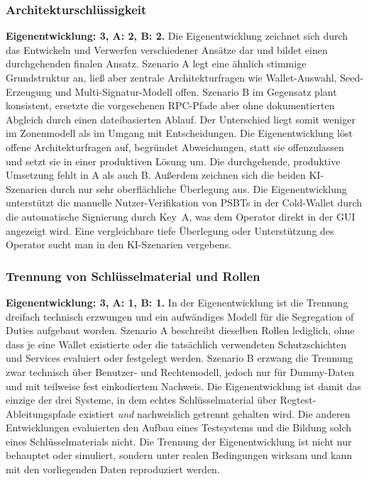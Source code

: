 {\subsubsection{Architekturschlüssigkeit}
\textbf{Eigenentwicklung: 3, A: 2, B: 2.} Die Eigenentwicklung zeichnet sich durch das Entwickeln und Verwerfen verschiedener Ansätze dar und bildet einen durchgehenden finalen Ansatz.
Szenario A legt eine ähnlich stimmige Grundstruktur an, ließ aber zentrale Architekturfragen wie Wallet-Auswahl, Seed-Erzeugung und Multi-Signatur-Modell offen.
Szenario B im Gegensatz plant konsistent, ersetzte die vorgesehenen \ac{RPC}-Pfade aber ohne dokumentierten Abgleich durch einen dateibasierten Ablauf. Der Unterschied liegt somit weniger im Zonenmodell als im Umgang mit Entscheidungen.
Die Eigenentwicklung löst offene Architekturfragen auf, begründet Abweichungen, statt sie offenzulassen und setzt sie in einer produktiven Lösung um. Die durchgehende, produktive Umsetzung fehlt in A als auch B.
Außerdem zeichnen sich die beiden \ac{KI}-Szenarien durch nur sehr oberflächliche Überlegung aus. Die Eigenentwicklung unterstützt die manuelle Nutzer-Verifikation von \acp{PSBT} in der Cold-Wallet durch die automatische Signierung durch Key~A, was dem Operator direkt in der \ac{GUI} angezeigt wird. 
Eine vergleichbare tiefe Überlegung oder Unterstützung des Operator sucht man in den \ac{KI}-Szenarien vergebens.

\subsubsection{Trennung von Schlüsselmaterial und Rollen}
\textbf{Eigenentwicklung: 3, A: 1, B: 1.} In der Eigenentwicklung ist die Trennung dreifach technisch erzwungen und ein aufwändiges Modell für die Segregation of Duties aufgebaut worden.
Szenario A beschreibt dieselben Rollen lediglich, ohne dass je eine Wallet existierte oder die tatsächlich verwendeten Schutzschichten und Services evaluiert oder festgelegt werden.
Szenario B erzwang die Trennung zwar technisch über Benutzer- und Rechtemodell, jedoch nur für Dummy-Daten und mit teilweise fest einkodiertem Nachweis. Die Eigenentwicklung ist damit das einzige der drei Systeme, in dem echtes Schlüsselmaterial über Regtest-Ableitungspfade existiert \emph{und} nachweislich getrennt gehalten wird. Die anderen Entwicklungen evaluierten den Aufbau eines Testsystems und die Bildung solch eines Schlüsselmaterials nicht.
Die Trennung der Eigenentwicklung ist nicht nur behauptet oder simuliert, sondern unter realen Bedingungen wirksam und kann mit den vorliegenden Daten reproduziert werden.


}
